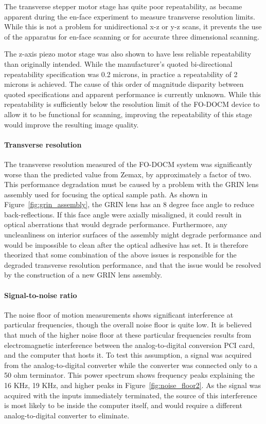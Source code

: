 The transverse stepper motor stage has quite poor repeatability, as became apparent during the en-face experiment to measure transverse resolution limits. While this is not a problem for unidirectional x-z or y-z scans, it prevents the use of the apparatus for en-face scanning or for accurate three dimensional scanning.

The z-axis piezo motor stage was also shown to have less reliable repeatability than originally intended. While the manufacturer's quoted bi-directional repeatability specification was 0.2 microns, in practice a repeatability of 2 microns is achieved. The cause of this order of magnitude disparity between quoted specifications and apparent performance is currently unknown. While this repeatability is sufficiently below the resolution limit of the FO-DOCM device to allow it to be functional for scanning, improving the repeatability of this stage would improve the resulting image quality.

\paragraph{Transverse resolution}

The transverse resolution measured of the FO-DOCM system was significantly worse than the predicted value from Zemax, by approximately a factor of two. This performance degradation must be caused by a problem with the GRIN lens assembly used for focusing the optical sample path. As shown in Figure~\ref{fig:grin_assembly}, the GRIN lens has an 8 degree face angle to reduce back-reflections. If this face angle were axially misaligned, it could result in optical aberrations that would degrade performance. Furthermore, any uncleanliness on interior surfaces of the assembly might degrade performance and would be impossible to clean after the optical adhesive has set. It is therefore theorized that some combination of the above issues is responsible for the degraded transverse resolution performance, and that the issue would be resolved by the construction of a new GRIN lens assembly.

\paragraph{Signal-to-noise ratio}

The noise floor of motion measurements shows significant interference at particular frequencies, though the overall noise floor is quite low. It is believed that much of the higher noise floor at these particular frequencies results from electromagnetic interference between the analog-to-digital conversion PCI card, and the computer that hosts it. To test this assumption, a signal was acquired from the analog-to-digital converter while the converter was connected only to a 50 ohm terminator. This power spectrum shows frequency peaks explaining the 16 KHz, 19 KHz, and higher peaks in Figure~\ref{fig:noise_floor2}. As the signal was acquired with the inputs immediately terminated, the source of this interference is most likely to be inside the computer itself, and would require a different analog-to-digital converter to eliminate. %

